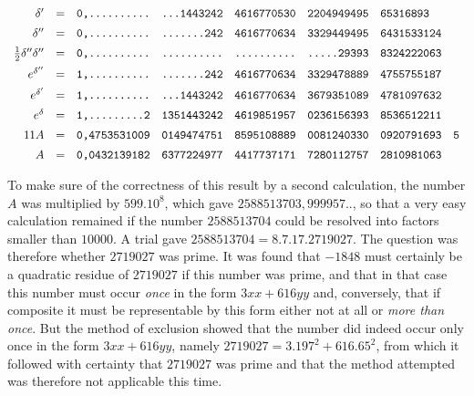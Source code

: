 \[\begin{array}{rcrlllll}
\delta'&=&\text{\ttfamily 0,..........}&\text{\ttfamily ...1443242}&\text{\ttfamily 4616770530}&\text{\ttfamily 2204949495}&\text{\ttfamily 65316893}&\\[5pt]
\delta''&=&\text{\ttfamily 0,..........}&\text{\ttfamily .......242}&\text{\ttfamily 4616770634}&\text{\ttfamily 3329449495}&\text{\ttfamily 6431533124}&\\[5pt]
\frac12\delta''\delta''&=&\text{\ttfamily 0,..........}&\text{\ttfamily ..........}&\text{\ttfamily ..........}&\text{\ttfamily .....29393}&\text{\ttfamily 8324222063}&\\[5pt]
e^{\delta''}&=&\text{\ttfamily 1,..........}&\text{\ttfamily .......242}&\text{\ttfamily 4616770634}&\text{\ttfamily 3329478889}&\text{\ttfamily 4755755187}&\\[5pt]
e^{\delta'}&=&\text{\ttfamily 1,..........}&\text{\ttfamily ...1443242}&\text{\ttfamily 4616770634}&\text{\ttfamily 3679351089}&\text{\ttfamily 4781097632}&\\[5pt]
e^\delta&=&\text{\ttfamily 1,.........2}&\text{\ttfamily 1351443242}&\text{\ttfamily 4619851957}&\text{\ttfamily 0236156393}&\text{\ttfamily 8536512211}&\\[5pt]
11A&=&\text{\ttfamily 0,4753531009}&\text{\ttfamily 0149474751}&\text{\ttfamily 8595108889}&\text{\ttfamily 0081240330}&\text{\ttfamily 0920791693}&\text{\ttfamily 5}\\[5pt]
A&=&\text{\ttfamily 0,0432139182}&\text{\ttfamily 6377224977}&\text{\ttfamily 4417737171}&\text{\ttfamily 7280112757}&\text{\ttfamily 2810981063}&
\end{array}
\]\endgroup

To make sure of the correctness of this result by a second calculation,
the number $A$ was multiplied by $599.10^8$, which gave
$2588513703,999957..$, so that a very easy calculation remained
if the number $2588513704$ could be resolved into factors smaller than $10000$.
A trial gave $2588513704=8.7.17.2719027$. The question was
therefore whether $2719027$ was prime. It was found that $-1848$ must certainly
be a quadratic residue of $2719027$ if this number was prime,
and that in that case this number must occur \textit{once} in the form $3xx+616yy$ and, conversely, that if composite it must be representable by this form
either not at all or \textit{more than once}.
But the method of exclusion showed that the number did indeed occur only once
in the form $3xx+616yy$, namely $2719027=3.197^2+616.65^2$,
from which it followed with certainty that $2719027$ was prime and that the
method attempted was therefore not applicable this time.

